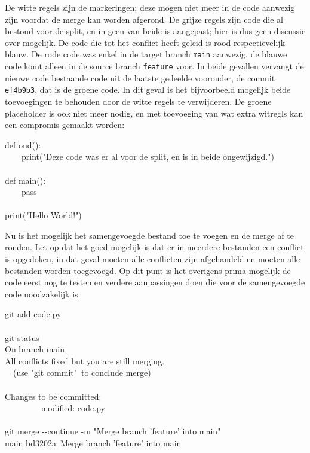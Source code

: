 De witte regels zijn de markeringen; deze mogen niet meer in de code aanwezig zijn voordat de merge kan worden afgerond. De grijze regels zijn code die al bestond voor de split, en in geen van beide is aangepast; hier is dus geen discussie over mogelijk. De code die tot het conflict heeft geleid is rood respectievelijk blauw. De rode code was enkel in de target branch \texttt{main} aanwezig, de blauwe code komt alleen in de source branch \texttt{feature} voor. In beide gevallen vervangt de nieuwe code bestaande code uit de laatste gedeelde voorouder, de commit \texttt{ef4b9b3}, dat is de groene code. In dit geval is het bijvoorbeeld mogelijk beide toevoegingen te behouden door de witte regels te verwijderen. De groene placeholder is ook niet meer nodig, en met toevoeging van wat extra witregls kan een compromis gemaakt worden:

\begin{bash}
{\color{ttgrey} def oud(): \\
\ \ \ \ print("Deze code was er al voor de split, en is in beide ongewijzigd.") } \\
~ \\
{\color{ttred} def main(): \\
\ \ \ \ pass } \\
~ \\
{\color{ttblue} print("Hello World!") } \\
\end{bash}

Nu is het mogelijk het samengevoegde bestand toe te voegen en de merge af te ronden. Let op dat het goed mogelijk is dat er in meerdere bestanden een conflict is opgedoken, in dat geval moeten alle conflicten zijn afgehandeld en moeten alle bestanden worden toegevoegd. Op dit punt is het overigens prima mogelijk de code eerst nog te testen en verdere aanpassingen doen die voor de samengevoegde code noodzakelijk is.

\begin{bash}
 git add code.py \\
~ \\
 git status \\
On branch main \\
All conflicts fixed but you are still merging. \\
\ \ (use "git commit"\ to conclude merge) \\
~ \\
Changes to be committed: \\
\ \ \ \ \ \ \ \ {\color{ttgreen} modified:   code.py} \\
~ \\
 git merge -\!-continue -m "Merge branch 'feature' into main" \\
\lbrack main bd3202a\rbrack\  Merge branch 'feature' into main \\
\end{bash}

